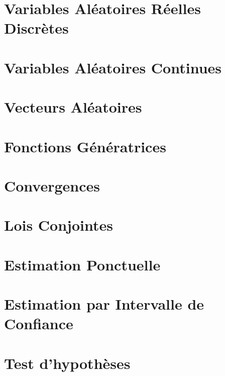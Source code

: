 



\chapter{Variables Aléatoires Réelles Discrètes}


\chapter{Variables Aléatoires Continues}


\chapter{Vecteurs Aléatoires}


\chapter{Fonctions Génératrices}


\chapter{Convergences}


\chapter{Lois Conjointes}


\chapter{Estimation Ponctuelle}


\chapter{Estimation par Intervalle de Confiance}


\chapter{Test d'hypothèses}
